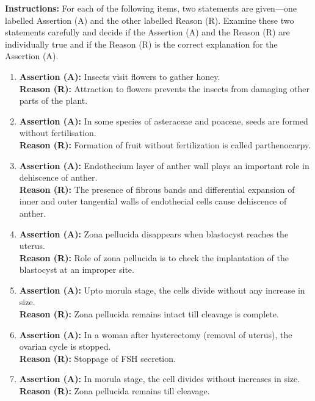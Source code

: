 \documentclass{article}
\begin{document}
\textbf{Instructions:} For each of the following items, two statements are given—one labelled Assertion (A) and the other labelled Reason (R). Examine these two statements carefully and decide if the Assertion (A) and the Reason (R) are individually true and if the Reason (R) is the correct explanation for the Assertion (A). 

\begin{enumerate}
    \item \textbf{Assertion (A):} Insects visit flowers to gather honey. \\
    \textbf{Reason (R):} Attraction to flowers prevents the insects from damaging other parts of the plant.

    \item \textbf{Assertion (A):} In some species of asteraceae and poaceae, seeds are formed without fertilisation. \\
    \textbf{Reason (R):} Formation of fruit without fertilization is called parthenocarpy.

    \item \textbf{Assertion (A):} Endothecium layer of anther wall plays an important role in dehiscence of anther. \\
    \textbf{Reason (R):} The presence of fibrous bands and differential expansion of inner and outer tangential walls of endothecial cells cause dehiscence of anther.

    \item \textbf{Assertion (A):} Zona pellucida disappears when blastocyst reaches the uterus. \\
    \textbf{Reason (R):} Role of zona pellucida is to check the implantation of the blastocyst at an improper site.

    \item \textbf{Assertion (A):} Upto morula stage, the cells divide without any increase in size. \\
    \textbf{Reason (R):} Zona pellucida remains intact till cleavage is complete.

    \item \textbf{Assertion (A):} In a woman after hysterectomy (removal of uterus), the ovarian cycle is stopped. \\
    \textbf{Reason (R):} Stoppage of FSH secretion.

    \item \textbf{Assertion (A):} In morula stage, the cell divides without increases in size. \\
    \textbf{Reason (R):} Zona pellucida remains till cleavage.


\end{enumerate}
\end{document}

